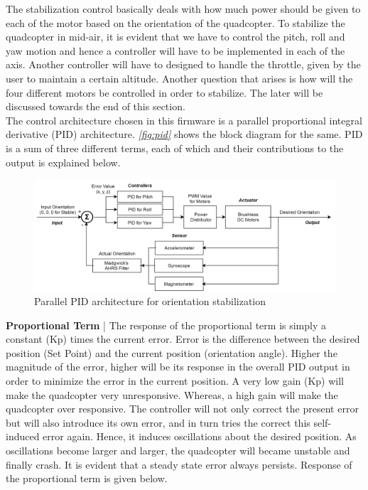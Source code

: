 \documentclass[a4paper,12pt,oneside]{book}
\begin{document}
The stabilization control basically deals with how much power should be given to each of the motor based on the orientation of the quadcopter. To stabilize the quadcopter in mid-air, it is evident that we have to control the pitch, roll and yaw motion and hence a controller will have to be implemented in each of the axis. Another controller will have to designed to handle the throttle, given by the user to maintain a certain altitude. Another question that arises is how will the four different motors be controlled in order to stabilize. The later will be discussed towards the end of this section.\\

The control architecture chosen in this firmware is a parallel proportional integral derivative (PID) architecture. \textit{\autoref{fig:pid}} shows the block diagram for the same. PID is a sum of three different terms, each of which and their contributions to the output is explained below.\\

\begin{figure}[!htb]
\centering
\includegraphics[width=\textwidth]{images/pid}
\caption{Parallel PID architecture for orientation stabilization}
\label{fig:pid}
\end{figure}

\textbf{Proportional Term} | The response of the proportional term is simply a constant (Kp) times the current error. Error is the difference between the desired position (Set Point) and the current position (orientation angle). Higher the magnitude of the error, higher will be its response in the overall PID output in order to minimize the error in the current position. A very low gain (Kp) will make the quadcopter very unresponsive. Whereas, a high gain will make the quadcopter over responsive. The controller will not only correct the present error but will also introduce its own error, and in turn tries the correct this self-induced error again. Hence, it induces oscillations about the desired position. As oscillations become larger and larger, the quadcopter will became unstable and finally crash. It is evident that a steady state error always persists. Response of the proportional term is given below. 
\end{document}
